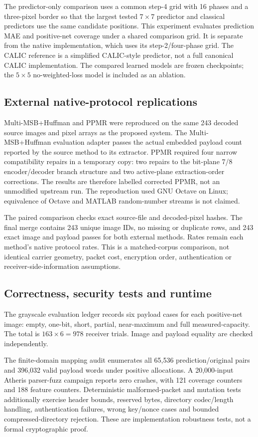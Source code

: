 \documentclass[preprint,12pt,a4paper]{elsarticle}
\newcommand{\ProposedSystem}{the proposed system\xspace}
\begin{document}
The predictor-only comparison uses a common step-4 grid with 16 phases and a three-pixel border so that the largest tested $7\times7$ predictor and classical predictors use the same candidate positions. This experiment evaluates prediction MAE and positive-net coverage under a shared comparison grid. It is separate from the native implementation, which uses its step-2/four-phase grid. The CALIC reference is a simplified CALIC-style predictor, not a full canonical CALIC implementation. The compared learned models are frozen checkpoints; the $5\times5$ no-weighted-loss model is included as an ablation.

\subsection{External native-protocol replications}

Multi-MSB+Huffman and PPMR were reproduced on the same 243 decoded source images and pixel arrays as \ProposedSystem. The Multi-MSB+Huffman evaluation adapter passes the actual embedded payload count reported by the source method to its extractor. PPMR required four narrow compatibility repairs in a temporary copy: two repairs to the bit-plane 7/8 encoder/decoder branch structure and two active-plane extraction-order corrections. The results are therefore labelled corrected PPMR, not an unmodified upstream run. The reproduction used GNU Octave on Linux; equivalence of Octave and MATLAB random-number streams is not claimed.

The paired comparison checks exact source-file and decoded-pixel hashes. The final merge contains 243 unique image IDs, no missing or duplicate rows, and 243 exact image and payload passes for both external methods. Rates remain each method's native protocol rates. This is a matched-corpus comparison, not identical carrier geometry, packet cost, encryption order, authentication or receiver-side-information assumptions.

\subsection{Correctness, security tests and runtime}

The grayscale evaluation ledger records six payload cases for each positive-net image: empty, one-bit, short, partial, near-maximum and full measured-capacity. The total is $163\times6=978$ receiver trials. Image and payload equality are checked independently.

The finite-domain mapping audit enumerates all 65,536 prediction/original pairs and 396,032 valid payload words under positive allocations. A 20,000-input Atheris parser-fuzz campaign reports zero crashes, with 121 coverage counters and 188 feature counters. Deterministic malformed-packet and mutation tests additionally exercise header bounds, reserved bytes, directory codec/length handling, authentication failures, wrong key/nonce cases and bounded compressed-directory rejection. These are implementation robustness tests, not a formal cryptographic proof.
\end{document}
